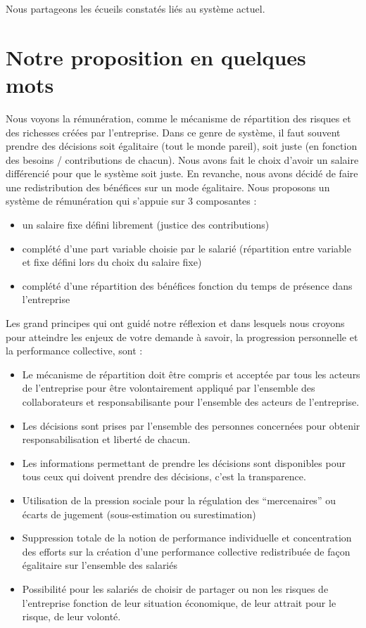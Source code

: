 \documentclass[12pt]{article}
\begin{document}
 Nous partageons les écueils constatés liés au système actuel.

\section{Notre proposition en quelques mots}
 Nous voyons la rémunération, comme le mécanisme de répartition des risques et des richesses créées par l’entreprise. Dans ce genre de système, il faut souvent prendre des décisions soit égalitaire (tout le monde pareil), soit juste (en fonction des besoins / contributions de chacun). Nous avons fait le choix d’avoir un salaire différencié pour que le système soit juste. En revanche, nous avons décidé de faire une redistribution des bénéfices sur un mode égalitaire. 
 Nous proposons un système de rémunération qui s’appuie sur 3 composantes :
 \begin{itemize}
   \item un salaire fixe défini librement (justice des contributions) 
   \item complété d’une part variable choisie par le salarié (répartition entre variable et fixe défini lors du choix du salaire fixe)
   \item complété d’une répartition des bénéfices fonction du temps de présence dans l’entreprise
 \end{itemize}

 Les grand principes qui ont guidé notre réflexion et dans lesquels nous croyons pour atteindre les enjeux de votre demande à savoir, la progression personnelle et la performance collective, sont :
 \begin{itemize}
   \item Le mécanisme de répartition doit être compris et acceptée par tous les acteurs de l’entreprise pour être volontairement appliqué par l’ensemble des collaborateurs et responsabilisante pour l’ensemble des acteurs de l’entreprise.
   \item Les décisions sont prises par l’ensemble des personnes concernées pour obtenir responsabilisation et liberté de chacun. 
   \item Les informations permettant de prendre les décisions sont disponibles pour tous ceux qui doivent prendre des décisions, c’est la transparence.
   \item Utilisation de la pression sociale pour la régulation des “mercenaires” ou écarts de jugement (sous-estimation ou surestimation)
   \item Suppression totale de la notion de performance individuelle et concentration des efforts sur la création d'une performance collective redistribuée de façon égalitaire sur l'ensemble des salariés 
   \item Possibilité pour les salariés de choisir de partager ou non les risques de l'entreprise fonction de leur situation économique, de leur attrait pour le risque, de leur volonté.
 \end{itemize}
\end{document}
